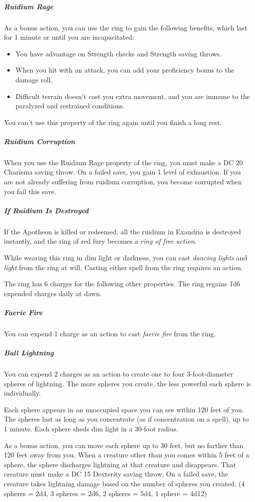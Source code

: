 \documentclass[10pt,a4paper,twoside,fancy,bg=print,twocolumn,openany,nodeprecatedcode]{dndbook}
\begin{document}
\subparagraph{Ruidium Rage}
As a bonus action, you can use the ring to gain the following benefits, which last for 1 minute or until you are incapacitated:


\begin{itemize}
\item You have advantage on Strength checks and Strength saving throws.
\item When you hit with an attack, you can add your proficiency bonus to the damage roll.
\item Difficult terrain doesn't cost you extra movement, and you are immune to the paralyzed and restrained conditions.
\end{itemize}

You can't use this property of the ring again until you finish a long rest.

\subparagraph{Ruidium Corruption}
When you use the Ruidium Rage property of the ring, you must make a DC 20 Charisma saving throw. On a failed save, you gain 1 level of exhaustion. If you are not already suffering from ruidium corruption, you become corrupted when you fail this save.

\subparagraph{If Ruidium Is Destroyed}
If the Apotheon is killed or redeemed, all the ruidium in Exandria is destroyed instantly, and the ring of red fury becomes a \textit{ring of free action}.

While wearing this ring in dim light or darkness, you can cast \textit{dancing lights} and \textit{light} from the ring at will. Casting either spell from the ring requires an action.

The ring has 6 charges for the following other properties. The ring regains 1d6 expended charges daily at dawn.

\subparagraph{Faerie Fire}
You can expend 1 charge as an action to cast \textit{faerie fire} from the ring.

\subparagraph{Ball Lightning}
You can expend 2 charges as an action to create one to four 3-foot-diameter spheres of lightning. The more spheres you create, the less powerful each sphere is individually.

Each sphere appears in an unoccupied space you can see within 120 feet of you. The spheres last as long as you concentrate (as if concentration on a spell), up to 1 minute. Each sphere sheds dim light in a 30-foot radius.

As a bonus action, you can move each sphere up to 30 feet, but no farther than 120 feet away from you. When a creature other than you comes within 5 feet of a sphere, the sphere discharges lightning at that creature and disappears. That creature must make a DC 15 Dexterity saving throw. On a failed save, the creature takes lightning damage based on the number of spheres you created. (4 spheres = 2d4, 3 spheres = 2d6, 2 spheres = 5d4, 1 sphere = 4d12)
\end{document}
